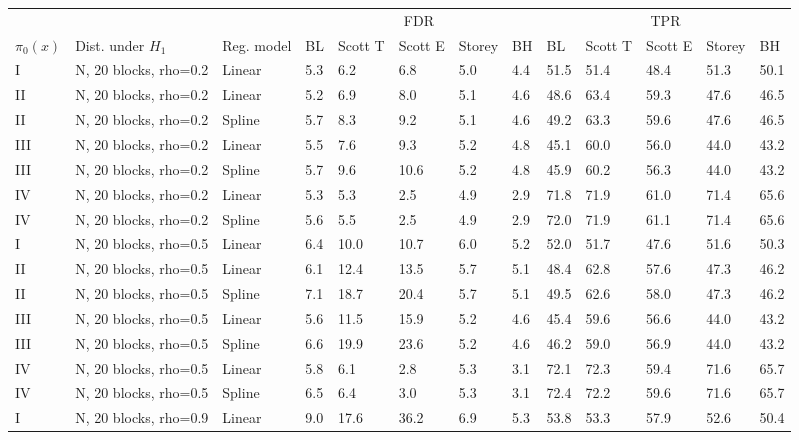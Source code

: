 \documentclass{article}\usepackage[]{graphicx}\usepackage[]{color}
\begin{document}
\begin{table}[ht]
\centering
\begin{tabular}{lll|lllll|lllll}
  \hline
  &&& \multicolumn{5}{c}{FDR} & \multicolumn{5}{c}{TPR}\\
 $\pi_0(x)$ &  Dist. under $H_1$ & Reg. model & BL & Scott T & Scott E & Storey & BH & BL & Scott T & Scott E & Storey & BH    \\
 \hline
I & N, 20 blocks, rho=0.2 & Linear & 5.3 & 6.2 & 6.8 & 5.0 & 4.4 & 51.5 & 51.4 & 48.4 & 51.3 & 50.1 \\ 
  II & N, 20 blocks, rho=0.2 & Linear & 5.2 & 6.9 & 8.0 & 5.1 & 4.6 & 48.6 & 63.4 & 59.3 & 47.6 & 46.5 \\ 
  II & N, 20 blocks, rho=0.2 & Spline & 5.7 & 8.3 & 9.2 & 5.1 & 4.6 & 49.2 & 63.3 & 59.6 & 47.6 & 46.5 \\ 
  III & N, 20 blocks, rho=0.2 & Linear & 5.5 & 7.6 & 9.3 & 5.2 & 4.8 & 45.1 & 60.0 & 56.0 & 44.0 & 43.2 \\ 
  III & N, 20 blocks, rho=0.2 & Spline & 5.7 & 9.6 & 10.6 & 5.2 & 4.8 & 45.9 & 60.2 & 56.3 & 44.0 & 43.2 \\ 
  IV & N, 20 blocks, rho=0.2 & Linear & 5.3 & 5.3 & 2.5 & 4.9 & 2.9 & 71.8 & 71.9 & 61.0 & 71.4 & 65.6 \\ 
  IV & N, 20 blocks, rho=0.2 & Spline & 5.6 & 5.5 & 2.5 & 4.9 & 2.9 & 72.0 & 71.9 & 61.1 & 71.4 & 65.6 \\ 
   \hline
I & N, 20 blocks, rho=0.5 & Linear & 6.4 & 10.0 & 10.7 & 6.0 & 5.2 & 52.0 & 51.7 & 47.6 & 51.6 & 50.3 \\ 
  II & N, 20 blocks, rho=0.5 & Linear & 6.1 & 12.4 & 13.5 & 5.7 & 5.1 & 48.4 & 62.8 & 57.6 & 47.3 & 46.2 \\ 
  II & N, 20 blocks, rho=0.5 & Spline & 7.1 & 18.7 & 20.4 & 5.7 & 5.1 & 49.5 & 62.6 & 58.0 & 47.3 & 46.2 \\ 
  III & N, 20 blocks, rho=0.5 & Linear & 5.6 & 11.5 & 15.9 & 5.2 & 4.6 & 45.4 & 59.6 & 56.6 & 44.0 & 43.2 \\ 
  III & N, 20 blocks, rho=0.5 & Spline & 6.6 & 19.9 & 23.6 & 5.2 & 4.6 & 46.2 & 59.0 & 56.9 & 44.0 & 43.2 \\ 
  IV & N, 20 blocks, rho=0.5 & Linear & 5.8 & 6.1 & 2.8 & 5.3 & 3.1 & 72.1 & 72.3 & 59.4 & 71.6 & 65.7 \\ 
  IV & N, 20 blocks, rho=0.5 & Spline & 6.5 & 6.4 & 3.0 & 5.3 & 3.1 & 72.4 & 72.2 & 59.6 & 71.6 & 65.7 \\ 
   \hline
I & N, 20 blocks, rho=0.9 & Linear & 9.0 & 17.6 & 36.2 & 6.9 & 5.3 & 53.8 & 53.3 & 57.9 & 52.6 & 50.4 \\ 

\end{tabular}
\end{table}
\end{document}
